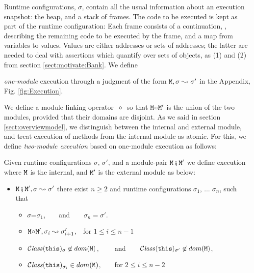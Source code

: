 Runtime configurations, $\sigma$,  contain   all the usual information about an execution snapshot: the heap, and a
stack of frames. The code to be executed is kept as part of the runtime configuration:
%
Each frame consists of a continuation, , describing the remaining code to be executed by the
frame, and a map from
variables to values. Values are either addresses or sets of addresses; the latter 
are needed to deal with assertions which quantify over sets of objects, as
\eg (1) and (2) from section \ref{sect:motivate:Bank}.
% 
We define {\emph{one-module} execution  through a judgment of the form ${\mbox{\tt{\ensuremath{{\mbox{\tt{M}}}}}}}, \sigma \leadsto \sigma'$ in the Appendix, Fig.  \ref{fig:Execution}. 
%
  

We define a module linking operator \  $\!\circ\!$ \  so that
${\mbox{\tt{\ensuremath{{\mbox{\tt{M}}}}}}}\!\circ\!{\mbox{\tt{\ensuremath{{\mbox{\tt{M}}}}}}}'$ is the union of the two modules, provided that their domains are disjoint.
As we said in section \ref{sect:overviewmodel}, we distinguish  between the internal and external module, and treat  execution of 
methods from the internal module as atomic. For this, we define \emph{two-module execution}  based on
one-module execution as follows:

\begin{definition}
\label{def:execution:internal:external}
\label{def:module_pair_execution} 
Given runtime configurations $\sigma$,  $\sigma'$,  and a module-pair ${\mbox{\tt{\ensuremath{{\mbox{\tt{M}}}}}}} \fatsemi {\mbox{\tt{\ensuremath{{\mbox{\tt{M}}}}}}}'$ we define
execution where ${\mbox{\tt{\ensuremath{{\mbox{\tt{M}}}}}}}$ is the internal, and ${\mbox{\tt{\ensuremath{{\mbox{\tt{M}}}}}}}'$ is the external module as below:
 
\begin{itemize}
\item
${\mbox{\tt{\ensuremath{{\mbox{\tt{M}}}}}}} \fatsemi {\mbox{\tt{\ensuremath{{\mbox{\tt{M}}}}}}}', \sigma \leadsto \sigma'$ \IFF
there exist  $n\geq 2$ and runtime configurations $\sigma_1$,  ...
$\sigma_n$, such that
\begin{itemize}
\item
$\sigma$=$\sigma_1$,\ \  \ \ and\ \ \ \ $\sigma_n=\sigma'$.
\item
${\mbox{\tt{\ensuremath{{\mbox{\tt{M}}}}}}} \!\circ\! {\mbox{\tt{\ensuremath{{\mbox{\tt{M}}}}}}}', \sigma_i \leadsto \sigma_{i+1}'$,\  \  for $1\leq i \leq n\!-\!1$
\item
${\mathcal C}{\mathit{lass}}({\mbox{\tt{this}}})_{\sigma}\not\in dom({{\mbox{\tt{\ensuremath{{\mbox{\tt{M}}}}}}}})$,  \ \  \ \ and\ \ \ \
${\mathcal C}{\mathit{lass}}({\mbox{\tt{this}}})_{\sigma'} \not\in dom({{\mbox{\tt{\ensuremath{{\mbox{\tt{M}}}}}}}})$,
\item
 ${\mathcal C}{\mathit{lass}}({\mbox{\tt{this}}})_{\sigma_i} \in dom({{\mbox{\tt{\ensuremath{{\mbox{\tt{M}}}}}}}})$,\ \ \ \ for $2\leq i \leq n\!-\!2$
\end{itemize}
\end{itemize}

\end{definition}

}
